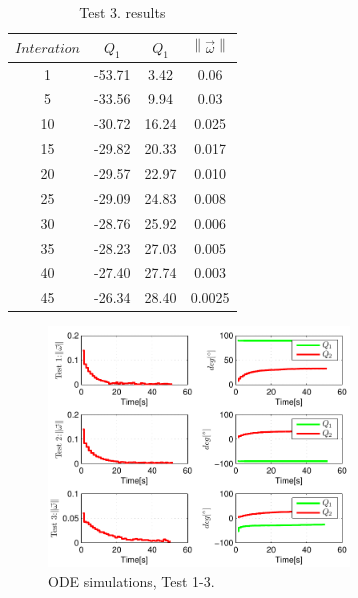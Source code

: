 \begin{table}
	\centering
\begin{tabular}{|c|c|c|c|}
	\hline
$Interation$ & $Q_1$ & $Q_1$  & $\left \| \vec{\omega} \right \|$\\
	\hline
1 & -53.71 & 3.42 & 0.06\\
5 & -33.56 & 9.94 & 0.03\\
10 & -30.72 & 16.24 &  0.025\\
15 & -29.82 & 20.33 & 0.017\\
20 & -29.57 & 22.97 &  0.010\\
25 & -29.09 & 24.83 &  0.008\\
30 & -28.76 & 25.92 &   0.006\\
35 & -28.23 & 27.03 & 0.005\\
40 & -27.40 & 27.74 &0.003\\
45 & -26.34 & 28.40 &  0.0025\\
\hline
\end{tabular}
\caption{Test 3. results}\label{tab:Simulations2}
\end{table}


\begin{figure}
	\centering
	\includegraphics[width=80mm]{./pictures/ODE_graph.pdf}
	\caption{ODE simulations, Test 1-3.}
	\label{fig:ODE graph}
\end{figure}
